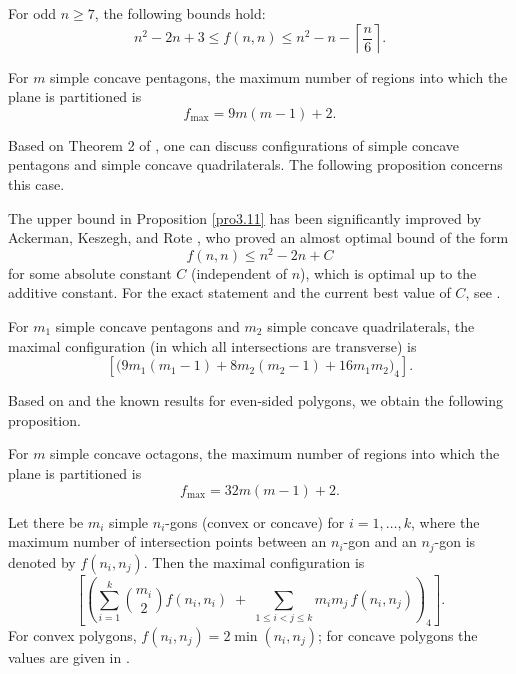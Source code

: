 \documentclass[article,11pt]{amsart} \numberwithin{equation}{section}
\numberwithin{equation}{section}
\begin{document}
{\begin{inp}
For odd $n \ge 7$, the following bounds hold:
\[
n^{2} - 2n + 3 \le f(n,n) \le n^{2} - n - \left\lceil \frac{n}{6} \right\rceil .
\]
\end{inp}

\begin{cor}
	For $m$ simple concave pentagons, the maximum number of regions into which the plane is partitioned is
	\[
	f_{\max}=9m(m-1)+2.
	\]
\end{cor}

Based on Theorem 2 of \cite{Cerny}, one can discuss configurations of simple concave pentagons and simple concave quadrilaterals. The following proposition concerns this case.

\begin{rk}
	The upper bound in Proposition \ref{pro3.11} has been significantly improved by Ackerman, Keszegh, and Rote \cite{Ackerman2022}, who proved an almost optimal bound of the form
	\[
	f(n,n) \le n^{2} - 2n + C
	\]
	for some absolute constant $C$ (independent of $n$), which is optimal up to the additive constant. For the exact statement and the current best value of $C$, see \cite{Ackerman2022}.
\end{rk}

\begin{inp}
	For $m_1$ simple concave pentagons and $m_2$ simple concave quadrilaterals, the maximal configuration (in which all intersections are transverse) is
	\[
	\left[ \bigl( 9m_1(m_1-1) + 8m_2(m_2-1) + 16m_1m_2 \bigr)_4 \right].
	\]
\end{inp}

Based on \cite{Ackerman2022} and the known results for even-sided polygons, we obtain the following proposition.

\begin{inp}
	For $m$ simple concave octagons, the maximum number of regions into which the plane is partitioned is
	\[
	f_{\max} = 32m(m-1) + 2.
	\]
\end{inp}

\begin{thm}
	Let there be $m_i$ simple $n_i$-gons (convex or concave) for $i=1,\dots,k$, where the maximum number of intersection points between an $n_i$-gon and an $n_j$-gon is denoted by $f(n_i,n_j)$. Then the maximal configuration is
	\[
	\left[ \left( \sum_{i=1}^{k} \binom{m_i}{2} f(n_i,n_i) \;+\; \sum_{1\le i<j\le k} m_i m_j \, f(n_i,n_j) \right)_4 \right].
	\]
	For convex polygons, $f(n_i,n_j)=2\min(n_i,n_j)$; for concave polygons the values are given in \cite{Cerny, Ackerman2022}.
\end{thm}

}
\end{document}
